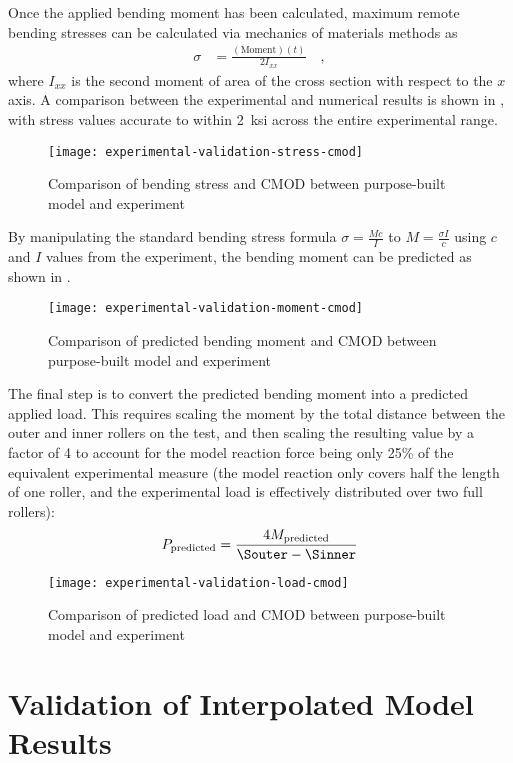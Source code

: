 Once the applied bending moment has been calculated, maximum remote bending stresses can be calculated via mechanics of materials methods as
\begin{align}
\sigma &= \frac{(\text{Moment})(t)}{2 I_{xx}}\quad,
\end{align}
where \(I_{xx}\) is the second moment of area of the cross section with respect to the \(x\) axis.
A comparison between the experimental and numerical results is shown in , with stress values accurate to within 2~ksi across the entire experimental range.
\begin{figure}[tbp]
\centering
\texttt{[image: experimental-validation-stress-cmod]}
\caption{\label{fig:exp_validation_stress_cmod} Comparison of bending stress and CMOD between purpose-built model and experiment}
\end{figure}
By manipulating the standard bending stress formula \(\sigma = \frac{M c}{I}\) to \(M = \frac{\sigma I}{c}\) using \(c\) and \(I\) values from the experiment, the bending moment can be predicted as shown in .
\begin{figure}[tbp]
\centering
\texttt{[image: experimental-validation-moment-cmod]}
\caption{\label{fig:exp_validation_moment_cmod} Comparison of predicted bending moment and CMOD between purpose-built model and experiment}
\end{figure}
The final step is to convert the predicted bending moment into a predicted applied load.
This requires scaling the moment by the total distance between the outer and inner rollers on the test, and then scaling the resulting value by a factor of 4 to account for the model reaction force being only 25\% of the equivalent experimental measure (the model reaction only covers half the length of one roller, and the experimental load is effectively distributed over two full rollers):
\[
P_\text{predicted} = \frac{4 M_\text{predicted}}{\Souter - \Sinner}
\]
\begin{figure}[tbp]
\centering
\texttt{[image: experimental-validation-load-cmod]}
\caption{\label{fig:exp_validation_load_cmod} Comparison of predicted load and CMOD between purpose-built model and experiment}
\end{figure}


\section{Validation of Interpolated Model Results}
\label{sec:validation-interpolated}

